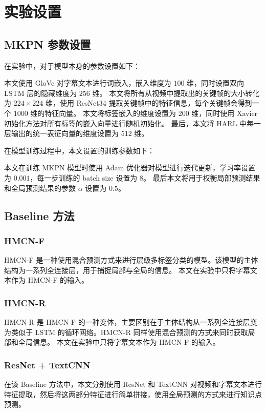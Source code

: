 \section{实验设置}
    \subsection{MKPN 参数设置}
    在实验中，对于模型本身的参数设置如下：

    本文使用 GloVe\cite{Pennington2014GloVeGV} 对字幕文本进行词嵌入，嵌入维度为 $100$ 维，同时设置双向 LSTM 层的隐藏维度为 $256$ 维。
    本文将所有从视频中提取出的关键帧的大小转化为 $224 \times 224$ 维，使用 ResNet34\cite{He2016DeepRL} 提取关键帧中的特征信息，每个关键帧会得到一个 $1000$ 维的特征向量。
    本文将标签嵌入的维度设置为 $200$ 维，同时使用 Xavier 初始化方法对所有标签的嵌入向量进行随机初始化。
    最后，本文将 HARL 中每一层输出的统一表征向量的维度设置为 $512$ 维。

    在模型训练过程中，本文设置的训练参数如下：

    本文在训练 MKPN 模型时使用 Adam\cite{Kingma2015AdamAM} 优化器对模型进行迭代更新，学习率设置为 $0.001$，每一步训练的 batch size 设置为 $8$。
    最后本文将用于权衡局部预测结果和全局预测结果的参数 $\alpha$ 设置为 $0.5$。

    \subsection{Baseline 方法}
    \subsubsection{HMCN-F\cite{Wehrmann2018HierarchicalMC}}
    HMCN-F 是一种使用混合预测方式来进行层级多标签分类的模型。该模型的主体结构为一系列全连接层，用于捕捉局部与全局的信息。
    本文在实验中只将字幕文本作为 HMCN-F 的输入。

    \subsubsection{HMCN-R\cite{Wehrmann2018HierarchicalMC}}
    HMCN-R 是 HMCN-F 的一种变体，主要区别在于主体结构从一系列全连接层变为类似于 LSTM 的循环网络。HMCN-R 同样使用混合预测的方式来同时获取局部和全局信息。
    本文在实验中只将字幕文本作为 HMCN-F 的输入。

    \subsubsection{ResNet + TextCNN\cite{He2016DeepRL, Kim2014ConvolutionalNN}}
    在该 Baseline 方法中，本文分别使用 ResNet 和 TextCNN 对视频和字幕文本进行特征提取，然后将这两部分特征进行简单拼接，使用全局预测的方式来进行知识点预测。

